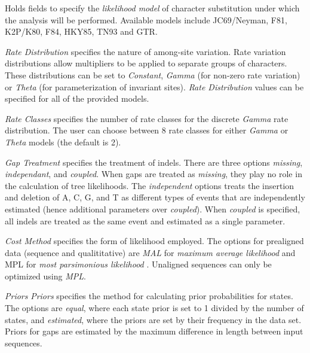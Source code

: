\begin{description}
\setlength{\parindent}{0.5cm}
	\item[Likelihood Model Parameters]
     		   Holds fields to specify the \emph{likelihood model} of character substitution under which 
		   the analysis will be performed.  Available models include JC69/Neyman, F81, K2P/K80, F84, 
		   HKY85, TN93 and GTR. 
		   
		   \indent \emph{Rate Distribution} specifies the nature of among-site variation. 
		   Rate variation distributions allow multipliers to be applied to separate groups of characters. 
		   These distributions can be set to \emph{Constant}, \emph{Gamma} (for non-zero 
		   rate variation) or  \emph{Theta} (for parameterization of invariant sites).  \emph{Rate Distribution} 
		   values can be specified for all of the provided models.
		   
		   \indent \emph{Rate Classes} specifies the number of rate classes for the discrete \emph{Gamma}
		   rate distribution. The user can choose between 8 rate classes for either \emph{Gamma} or \emph{Theta}
		   models (the default is 2).
		   
		   \indent \emph{Gap Treatment}  specifies the treatment of indels.  There are three options \emph{missing},
		   \emph{independant}, and \emph{coupled}.  When gaps are treated as \emph{missing}, they play no role 
		   in the calculation of tree likelihoods.  The \emph{independent} options treats the insertion and deletion of 
		   A, C, G, and T as different types of events that are independently estimated (hence additional parameters 
		   over \emph{coupled}). When \emph{coupled} is specified, all indels are treated as the same event and 
		   estimated as a single parameter.

		   \indent \emph{Cost Method} specifies the form of likelihood employed.  The options for prealigned data 
		   (sequence and qualititative) are \emph{MAL} for \emph{maximum average likelihood} and {MPL} for 
		   \emph{most parsimonious likelihood} \cite{barryandhartigan1987}. Unaligned sequences can only be 
		   optimized using \emph{MPL}.
		   
		   \indent \emph{Priors} \emph{Priors} specifies the method for calculating prior probabilities for states.  
		   The options are \emph{equal}, where each state prior is set to 1 divided by the number of states, and 
		   \emph{estimated}, where the priors are set by their frequency in the data set.  Priors for gaps are estimated 
		   by the maximum difference in length between input sequences.


\end{description}
